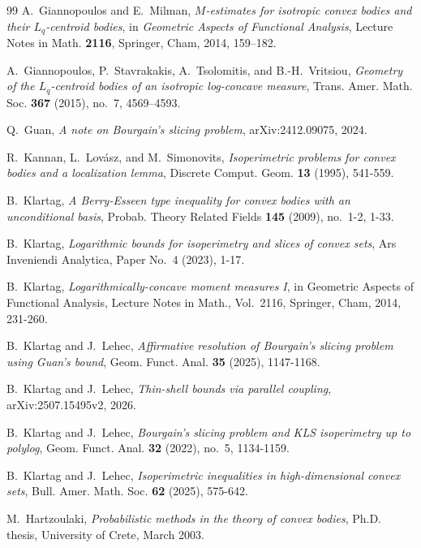 \documentclass[12pt]{article}
\theoremstyle{definition}
\theoremstyle{remark}
\begin{document}
\begin{thebibliography}{99}
A.~Giannopoulos and E.~Milman,
\emph{$M$-estimates for isotropic convex bodies and their
$L_q$-centroid bodies},
in \emph{Geometric Aspects of Functional Analysis},
Lecture Notes in Math. \textbf{2116},
Springer, Cham, 2014, 159--182.

A.~Giannopoulos, P.~Stavrakakis, A.~Tsolomitis, and B.-H.~Vritsiou,
\emph{Geometry of the $L_q$-centroid bodies of an isotropic
log-concave measure},
Trans. Amer. Math. Soc. \textbf{367} (2015), no.~7, 4569--4593.

Q.~Guan,
\emph{A note on Bourgain's slicing problem},
arXiv:2412.09075, 2024.

R.~Kannan, L.~Lov\'asz, and M.~Simonovits,
\emph{Isoperimetric problems for convex bodies and a localization lemma},
Discrete Comput. Geom. \textbf{13} (1995), 541-559.

B.~Klartag,
\emph{A Berry-Esseen type inequality for convex bodies with an unconditional basis},
Probab. Theory Related Fields \textbf{145} (2009), no.~1-2, 1-33.

B.~Klartag,
\emph{Logarithmic bounds for isoperimetry and slices of convex sets},
Ars Inveniendi Analytica, Paper No.~4 (2023), 1-17.

B.~Klartag,
\emph{Logarithmically-concave moment measures I},
in Geometric Aspects of Functional Analysis,
Lecture Notes in Math., Vol.~2116, Springer, Cham, 2014, 231-260.

B.~Klartag and J.~Lehec,
\emph{Affirmative resolution of Bourgain's slicing problem using Guan's bound},
Geom. Funct. Anal. \textbf{35} (2025), 1147-1168.

B.~Klartag and J.~Lehec,
\emph{Thin-shell bounds via parallel coupling},
arXiv:2507.15495v2, 2026.

B.~Klartag and J.~Lehec,
\emph{Bourgain's slicing problem and KLS isoperimetry up to polylog},
Geom. Funct. Anal. \textbf{32} (2022), no.~5, 1134-1159.

B.~Klartag and J.~Lehec,
\emph{Isoperimetric inequalities in high-dimensional convex sets},
Bull. Amer. Math. Soc. \textbf{62} (2025), 575-642.

M.~Hartzoulaki,
\emph{Probabilistic methods in the theory of convex bodies},
Ph.D. thesis, University of Crete, March 2003.


\end{thebibliography}
\end{document}
